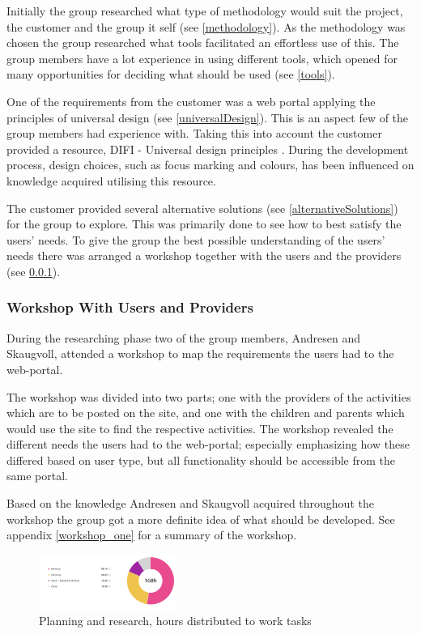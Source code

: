 Initially the group researched what type of methodology would suit the project, the customer and the group it self (see \ref{methodology}). As the methodology was chosen the group researched what tools facilitated an effortless use of this. The group members have a lot experience in using different tools, which opened for many opportunities for deciding what should be used (see \ref{tools}).

One of the requirements from the customer was a web portal applying the principles of universal design (see \ref{universalDesign}). This is an aspect few of the group members had experience with. Taking this into account the customer provided a resource, DIFI - Universal design principles \cite{Difi}. During the development process, design choices, such as focus marking and colours, has been influenced on knowledge acquired utilising this resource. 

The customer provided several alternative solutions (see \ref{alternativeSolutions}) for the group to explore.  This was primarily done to see how to best satisfy the users' needs. To give the group the best possible understanding of the users' needs there was arranged a workshop together with the users and the providers (see \ref{workshop}). 


\subsubsection{Workshop With Users and Providers}
\label{workshop}
During the researching phase two of the group members, Andresen and Skaugvoll, attended a workshop to map the requirements the users had to the web-portal. 

The workshop was divided into two parts; one with the providers of the activities which are to be posted on the site, and one with the children and parents which would use the site to find the respective activities. The workshop revealed the different needs the users had to the web-portal; especially emphasizing how these differed based on user type, but all functionality should be accessible from the same portal. 

Based on the knowledge Andresen and Skaugvoll acquired throughout the workshop the group got a more definite idea of what should be developed. See appendix \ref{workshop_one} for a summary of the workshop.

\begin{figure}[h!]
\centering
    \includegraphics[width=0.4\textwidth]{fig/planning-and-research-diagram}
\caption{Planning and research, hours distributed to work tasks}
\end{figure}


